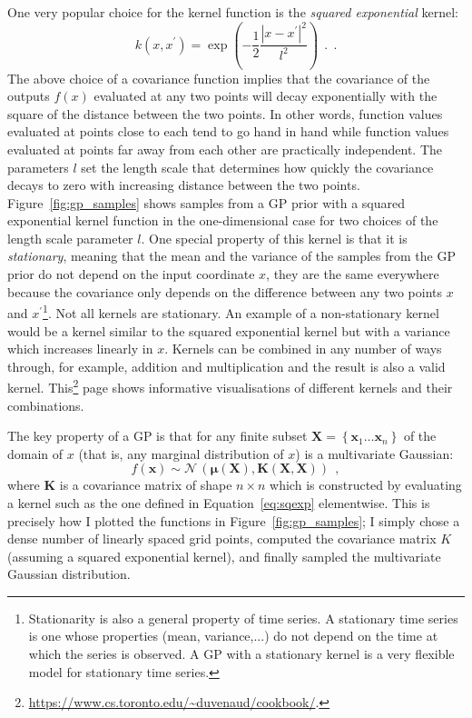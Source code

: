 \documentclass[12pt,dvipsnames]{report}
\renewcommand{\vec}[1]{\boldsymbol{\mathbf{#1}}}
\newcommand{\hquad}{~~}
\begin{document}
One very popular choice for the kernel function is the \emph{squared
    exponential} kernel:
\begin{equation}
    k(x, x^\prime) = \exp\left(-\frac{1}{2}\frac{\left|x-x^\prime\right|^2}{l^2}\right)\hquad .
    \hquad.
    \label{eq:sqexp}
\end{equation}
The above choice of a covariance function implies that the covariance of the outputs
$f(x)$ evaluated at any two points  will decay exponentially with the square of
the distance between the two points.
In other words, function values evaluated at points close to each tend to go hand in hand
while function values evaluated at points far away from each other are practically
independent.
The parameters $l$ set the length scale that determines how quickly the covariance decays
to zero with increasing distance between the two points.
Figure~\ref{fig:gp_samples} shows samples from a GP prior with a squared exponential
kernel function in the one-dimensional case for two choices of the length scale parameter
$l$. One special property of this kernel is that it is \emph{stationary}, meaning
that the mean and the variance of the samples from the GP prior do not depend on the
input coordinate $x$, they are the same everywhere because
the covariance only depends on the difference between any two points $x$ and
$x^\prime$\footnote{Stationarity is also a general property of time series.
    A stationary  time series is one whose properties (mean, variance,...) do not depend
    on the time at which the series is observed. A GP with a stationary kernel is a very flexible
    model for stationary time series.}. Not all kernels are stationary. An example of
a non-stationary kernel would be a kernel similar to the squared exponential kernel but with
a variance which increases linearly in $x$.
Kernels can be combined in any number of ways through, for example, addition and
multiplication and the result is also a valid kernel.
This\footnote{\url{https://www.cs.toronto.edu/~duvenaud/cookbook/}.} page shows
informative visualisations of different kernels and their combinations.

The key property of a GP is that for any finite subset
$\vec{X}=\left\{\mathbf{x}_{1} \ldots \mathbf{x}_{n}\right\}$ of the domain of
$x$ (that is, any marginal distribution of $x$) is a multivariate Gaussian:
\begin{equation}
    f(\vec{x})\sim \mathcal{N}\,(\vec{\mu}(\vec{X}), \vec K(\vec{X}, \vec{X}))
    \hquad,
\end{equation}
where $\vec K$ is a covariance matrix of shape $n\times n$ which is constructed by
evaluating  a kernel such as the one defined in Equation~\ref{eq:sqexp} elementwise.
This is precisely how I plotted
the functions in Figure~\ref{fig:gp_samples}; I simply chose a dense number of linearly
spaced grid points, computed the covariance matrix $K$ (assuming a squared exponential kernel), 
and finally sampled the multivariate Gaussian distribution.
\end{document}
